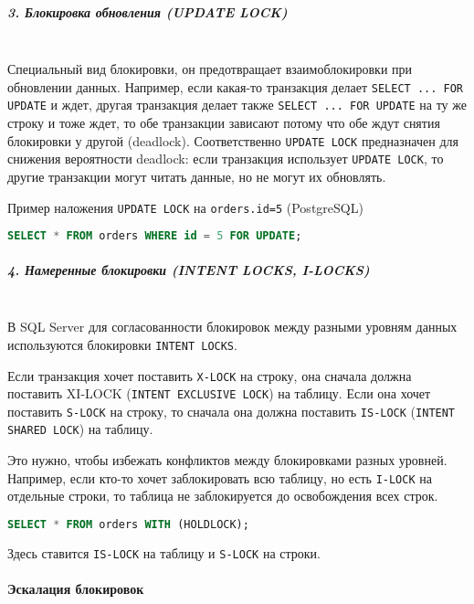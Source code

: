  \subparagraph{3. Блокировка обновления (UPDATE LOCK)} ~\\

 Специальный вид блокировки, он предотвращает взаимоблокировки при обновлении данных.
 Например, если какая-то транзакция делает \texttt{SELECT ... FOR UPDATE} и ждет, другая транзакция делает также \texttt{SELECT ... FOR UPDATE} на ту же строку и тоже ждет, то обе транзакции зависают потому что обе ждут снятия блокировки у другой (deadlock). 
 Соответственно \texttt{UPDATE LOCK} предназначен для снижения вероятности deadlock: если транзакция использует \texttt{UPDATE LOCK}, то другие транзакции могут читать данные, но не могут их обновлять.
 
 Пример наложения \texttt{UPDATE LOCK} на \texttt{orders.id=5} (PostgreSQL)
 \begin{lstlisting}[language=SQL]
     SELECT * FROM orders WHERE id = 5 FOR UPDATE;
 \end{lstlisting}
 
 \subparagraph{4. Намеренные блокировки (INTENT LOCKS, I-LOCKS)} ~\\

 В SQL Server для согласованности блокировок между разными уровням данных используются блокировки \texttt{INTENT LOCKS}. \autocite{MicrosoftLearnSQLserverTransLock}
 
 Если транзакция хочет поставить \texttt{X-LOCK} на строку, она сначала должна поставить XI-LOCK (\texttt{INTENT EXCLUSIVE LOCK}) на таблицу. Если она хочет поставить \texttt{S-LOCK} на строку, то сначала она должна поставить \texttt{IS-LOCK} (\texttt{INTENT SHARED LOCK}) на таблицу.
 
 Это нужно, чтобы избежать конфликтов между блокировками разных уровней. Например, если кто-то хочет заблокировать всю таблицу, но есть \texttt{I-LOCK} на отдельные строки, то таблица не заблокируется до освобождения всех строк.
 
 \begin{lstlisting}[language=SQL]
     SELECT * FROM orders WITH (HOLDLOCK);
 \end{lstlisting}
 
 Здесь ставится \texttt{IS-LOCK} на таблицу и \texttt{S-LOCK} на строки.

\paragraph{Эскалация блокировок} ~\\

